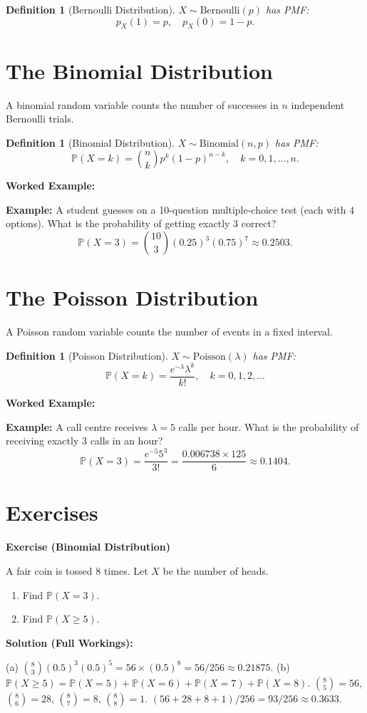 \documentclass[12pt,a4paper,oneside]{report}
\theoremstyle{mytheorem}
\theoremstyle{mydefinition}
\newtheorem{definition}[theorem]{Definition}
\theoremstyle{myremark}
\newenvironment{exercise}[1]{%
  \par\medskip\noindent\textbf{\color{myblue}Exercise (#1)}\par\smallskip
}{%
  \par\smallskip
}
\newenvironment{solution}{%
  \par\noindent\textbf{\color{mygreen}Solution (Full Workings):}\par\smallskip
}{%
  \par\bigskip
}
\newenvironment{worked}{%
  \par\medskip\noindent\textbf{\color{myorange}Worked Example:}\par\smallskip
}{%
  \par\medskip
}
\newcommand{\Prob}{\mathbb{P}}
\begin{document}
\begin{definition}[Bernoulli Distribution]
$X \sim \text{Bernoulli}(p)$ has PMF:
\[
p_X(1) = p, \quad p_X(0) = 1-p.
\]
\end{definition}

\section{The Binomial Distribution}
A binomial random variable counts the number of successes in $n$ independent Bernoulli trials.

\begin{definition}[Binomial Distribution]
$X \sim \text{Binomial}(n, p)$ has PMF:
\[
\Prob(X = k) = \binom{n}{k} p^k (1-p)^{n-k}, \quad k = 0,1,\ldots,n.
\]
\end{definition}

\begin{worked}
\textbf{Example:}
A student guesses on a 10-question multiple-choice test (each with 4 options). What is the probability of getting exactly 3 correct?
\[
\Prob(X = 3) = \binom{10}{3} (0.25)^3 (0.75)^7 \approx 0.2503.
\]
\end{worked}

\section{The Poisson Distribution}
A Poisson random variable counts the number of events in a fixed interval.

\begin{definition}[Poisson Distribution]
$X \sim \text{Poisson}(\lambda)$ has PMF:
\[
\Prob(X = k) = \frac{e^{-\lambda} \lambda^k}{k!}, \quad k = 0,1,2,\ldots
\]
\end{definition}

\begin{worked}
\textbf{Example:}
A call centre receives $\lambda = 5$ calls per hour. What is the probability of receiving exactly 3 calls in an hour?
\[
\Prob(X = 3) = \frac{e^{-5} 5^3}{3!} = \frac{0.006738 \times 125}{6} \approx 0.1404.
\]
\end{worked}

\section{Exercises}
\begin{exercise}{Binomial Distribution}
A fair coin is tossed 8 times. Let $X$ be the number of heads.
\begin{enumerate}[label=(\alph*)]
    \item Find $\Prob(X = 3)$.
    \item Find $\Prob(X \ge 5)$.
\end{enumerate}
\end{exercise}
\begin{solution}
(a) $\binom{8}{3}(0.5)^3(0.5)^5 = 56 \times (0.5)^8 = 56/256 \approx 0.21875$.
(b) $\Prob(X \ge 5) = \Prob(X=5) + \Prob(X=6) + \Prob(X=7) + \Prob(X=8)$.
$\binom{8}{5} = 56$, $\binom{8}{6} = 28$, $\binom{8}{7} = 8$, $\binom{8}{8} = 1$.
$(56 + 28 + 8 + 1)/256 = 93/256 \approx 0.3633$.
\end{solution}
\end{document}
